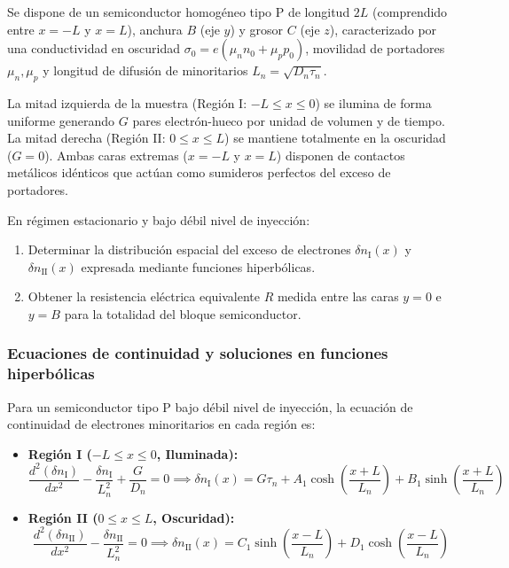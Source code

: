 \newpage
\begin{problema}
Se dispone de un semiconductor homogéneo tipo P de longitud $2L$ (comprendido entre $x = -L$ y $x = L$), anchura $B$ (eje $y$) y grosor $C$ (eje $z$), caracterizado por una conductividad en oscuridad $\sigma_0 = e(\mu_n n_0 + \mu_p p_0)$, movilidad de portadores $\mu_n, \mu_p$ y longitud de difusión de minoritarios $L_n = \sqrt{D_n \tau_n}$.

La mitad izquierda de la muestra (Región I: $-L \le x \le 0$) se ilumina de forma uniforme generando $G$ pares electrón-hueco por unidad de volumen y de tiempo. La mitad derecha (Región II: $0 \le x \le L$) se mantiene totalmente en la oscuridad ($G = 0$). Ambas caras extremas ($x = -L$ y $x = L$) disponen de contactos metálicos idénticos que actúan como sumideros perfectos del exceso de portadores.

En régimen estacionario y bajo débil nivel de inyección:
\begin{enumerate}[label=\alph*)]
    \item Determinar la distribución espacial del exceso de electrones $\delta n_{\text{I}}(x)$ y $\delta n_{\text{II}}(x)$ expresada mediante funciones hiperbólicas.
    \item Obtener la resistencia eléctrica equivalente $R$ medida entre las caras $y = 0$ e $y = B$ para la totalidad del bloque semiconductor.
\end{enumerate}

\tcblower
\subsubsection*{Ecuaciones de continuidad y soluciones en funciones hiperbólicas}
Para un semiconductor tipo P bajo débil nivel de inyección, la ecuación de continuidad de electrones minoritarios en cada región es:
\begin{itemize}
    \item \textbf{Región I ($-L \le x \le 0$, Iluminada):}
    \[
    \frac{d^2(\delta n_{\text{I}})}{dx^2} - \frac{\delta n_{\text{I}}}{L_n^2} + \frac{G}{D_n} = 0 \implies \delta n_{\text{I}}(x) = G \tau_n + A_1 \cosh\left(\frac{x+L}{L_n}\right) + B_1 \sinh\left(\frac{x+L}{L_n}\right)
    \]
    \item \textbf{Región II ($0 \le x \le L$, Oscuridad):}
    \[
    \frac{d^2(\delta n_{\text{II}})}{dx^2} - \frac{\delta n_{\text{II}}}{L_n^2} = 0 \implies \delta n_{\text{II}}(x) = C_1 \sinh\left(\frac{x-L}{L_n}\right) + D_1 \cosh\left(\frac{x-L}{L_n}\right)
    \]
\end{itemize}


\end{problema}

